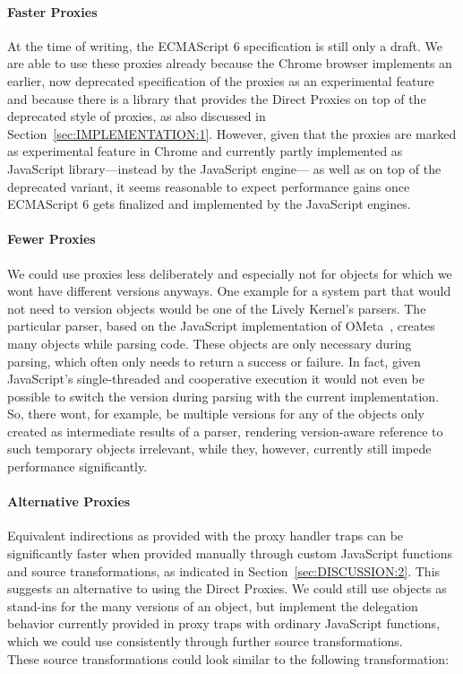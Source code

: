 \paragraph{Faster Proxies}
At the time of writing, the ECMAScript 6 specification is still only a draft.
We are able to use these proxies already because the Chrome browser implements an earlier, now deprecated specification of the proxies as an experimental feature and because there is a library that provides the Direct Proxies on top of the deprecated style of proxies, as also discussed in Section~\ref{sec:IMPLEMENTATION:1}.
However, given that the proxies are marked as experimental feature in Chrome and currently partly implemented as JavaScript library---instead by the JavaScript engine--- as well as on top of the deprecated variant, it seems reasonable to expect performance gains once ECMAScript 6 gets finalized and implemented by the JavaScript engines.

\paragraph{Fewer Proxies}
We could use proxies less deliberately and especially not for objects for which we wont have different versions anyways.
One example for a system part that would not need to version objects would be one of the Lively Kernel's parsers.
The particular parser, based on the JavaScript implementation of OMeta~\cite{Warth2007OOL}, creates many objects while parsing code.
These objects are only necessary during parsing, which often only needs to return a success or failure.
In fact, given JavaScript's single-threaded and cooperative execution it would not even be possible to switch the version during parsing with the current implementation.
So, there wont, for example, be multiple versions for any of the objects only created as intermediate results of a parser, rendering version-aware reference to such temporary objects irrelevant, while they, however, currently still impede performance significantly.

\paragraph{Alternative Proxies}
Equivalent indirections as provided with the proxy handler traps can be significantly faster when provided manually through custom JavaScript functions and source transformations, as indicated in Section~\ref{sec:DISCUSSION:2}.
This suggests an alternative to using the Direct Proxies.
We could still use objects as stand-ins for the many versions of an object, but implement the delegation behavior currently provided in proxy traps with ordinary JavaScript functions, which we could use consistently through further source transformations.\\
These source transformations could look similar to the following transformation:

